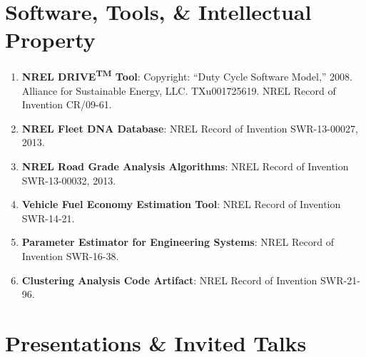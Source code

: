 \documentclass[11pt,letterpaper]{article}
\begin{document}
\section{Software, Tools, \& Intellectual Property}

\begin{enumerate}[noitemsep]
  \item \textbf{NREL DRIVE\textsuperscript{TM} Tool}: Copyright: ``Duty Cycle Software
        Model,'' 2008. Alliance for Sustainable Energy, LLC. TXu001725619.
        NREL Record of Invention CR/09-61.
  \item \textbf{NREL Fleet DNA Database}: NREL Record of Invention SWR-13-00027, 2013.
  \item \textbf{NREL Road Grade Analysis Algorithms}: NREL Record of Invention
        SWR-13-00032, 2013.
  \item \textbf{Vehicle Fuel Economy Estimation Tool}: NREL Record of Invention SWR-14-21.
  \item \textbf{Parameter Estimator for Engineering Systems}: NREL Record of Invention
        SWR-16-38.
  \item \textbf{Clustering Analysis Code Artifact}: NREL Record of Invention SWR-21-96.
\end{enumerate}

\section{Presentations \& Invited Talks}
\end{document}
